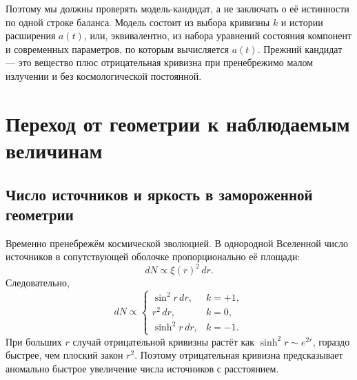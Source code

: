 \begin{classroomqa}
\end{classroomqa}

Поэтому мы должны проверять модель-кандидат, а не заключать о её истинности по одной строке баланса. Модель состоит из выбора кривизны \(k\) и истории расширения \(a(t)\), или, эквивалентно, из набора уравнений состояния компонент и современных параметров, по которым вычисляется \(a(t)\). Прежний кандидат — это вещество плюс отрицательная кривизна при пренебрежимо малом излучении и без космологической постоянной.

\section{Переход от геометрии к наблюдаемым величинам}

\subsection{Число источников и яркость в замороженной геометрии}

Временно пренебрежём космической эволюцией. В однородной Вселенной число источников в сопутствующей оболочке пропорционально её площади:
\begin{equation}
dN\propto \xi(r)^2\,dr.
\label{eq:c06-shell-count}
\end{equation}
Следовательно,
\begin{equation}
dN\propto
\begin{cases}
\sin^2r\,dr, & k=+1,\\
r^2\,dr, & k=0,\\
\sinh^2r\,dr, & k=-1.
\end{cases}
\end{equation}
При больших \(r\) случай отрицательной кривизны растёт как \(\sinh^2r\sim e^{2r}\), гораздо быстрее, чем плоский закон \(r^2\). Поэтому отрицательная кривизна предсказывает аномально быстрое увеличение числа источников с расстоянием.

